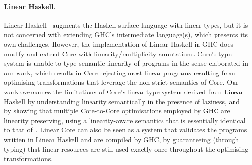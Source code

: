 \documentclass[acmsmall,review,screen]{acmart}
\begin{document}
\paragraph{Linear Haskell\label{sec:related-work-linear-haskell}.}
%
%
Linear Haskell~\cite{cite:linearhaskell} augments the Haskell surface language
with linear types, but it is not concerned with extending GHC's intermediate
language(s), which presents its own challenges. 
%
However, the implementation of Linear Haskell in GHC does modify and extend Core
with linearity/multiplicity annotations. Core's type system is unable to type
semantic linearity of programs in the sense elaborated in our work,
which results in Core rejecting most linear programs resulting from optimising
transformations that leverage the non-strict semantics of Core.
%
Our work overcomes the limitations of Core's linear type system derived from
Linear Haskell by understanding linearity semantically in the presence of
laziness, and by showing that multiple Core-to-Core
optimisations employed by GHC are linearity preserving, using a
linearity-aware semantics that is essentially identical to that of~\cite{cite:linearhaskell}.
Linear Core can also be seen as a system that validates the programs written in
Linear Haskell and are compiled by GHC, by guaranteeing (through typing) that
linear resources are still used exactly once throughout the optimising
transformations.
\end{document}
